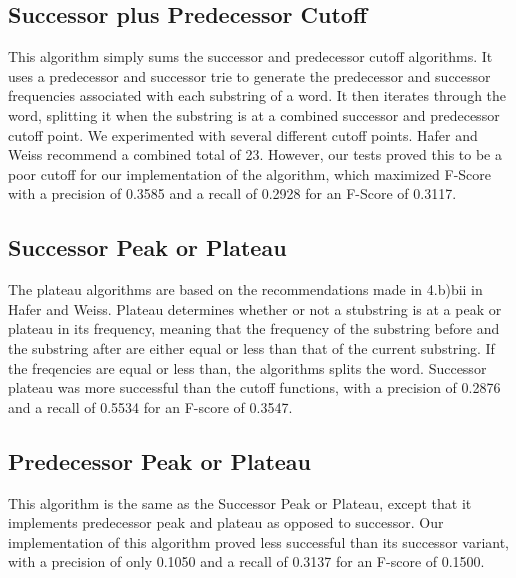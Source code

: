 \documentclass[11pt,letterpaper]{article}
\begin{document}
\subsection{Successor plus Predecessor Cutoff}
 This algorithm simply sums the successor and predecessor cutoff algorithms. It uses a predecessor and successor trie to generate the predecessor and successor frequencies associated with each substring of a word. It then iterates through the word, splitting it when the substring is at a combined successor and predecessor cutoff point. We experimented with several different cutoff points. Hafer and Weiss recommend a combined total of 23. However, our tests proved this to be a poor cutoff for our implementation of the algorithm, which maximized F-Score with a precision of 0.3585 and a recall of 0.2928 for an F-Score of 0.3117.
 
 

\subsection{Successor Peak or Plateau}
  The plateau algorithms are based on the recommendations made in 4.b)bii in Hafer and Weiss. Plateau determines whether or not a stubstring is at a peak or plateau in its frequency, meaning that the frequency of the substring before and the substring after are either equal or less than that of the current substring. If the freqencies are equal or less than, the algorithms splits the word. Successor plateau was more successful than the cutoff functions, with a precision of 0.2876 and a recall of 0.5534 for an F-score of 0.3547.
    
\subsection{Predecessor Peak or Plateau}
  This algorithm is the same as the Successor Peak or Plateau, except that it implements predecessor peak and plateau as opposed to successor. Our implementation of this algorithm proved less successful than its successor variant, with a precision of only 0.1050 and a recall of 0.3137 for an F-score of 0.1500. 
    
 
\end{document}
